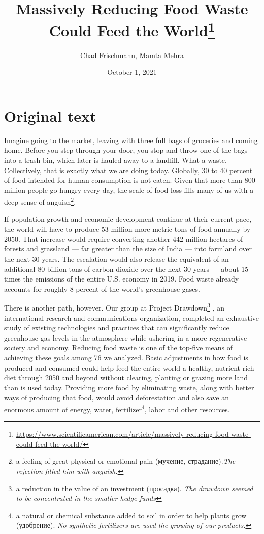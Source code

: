 \documentclass[a4paper]{article}
\title{Massively Reducing Food Waste Could Feed the World\footnote{\url{https://www.scientificamerican.com/article/massively-reducing-food-waste-could-feed-the-world/}}}
\author{Chad Frischmann, Mamta Mehra}
\date{October 1, 2021}
\begin{document}
	\maketitle
\section*{Original text}
Imagine going to the market, leaving with three full bags of groceries and coming home. Before you step through your door, you stop and throw one of the bags into a trash bin, which later is hauled away to a landfill. What a waste. Collectively, that is exactly what we are doing today. Globally, 30 to 40 percent of food intended for human consumption is not eaten. Given that more than 800 million people go hungry every day, the scale of food loss fills many of us with a deep sense of anguish\footnote{a feeling of great physical or emotional pain (мучение, страдание).\emph{The rejection filled him with anguish.}}.

If population growth and economic development continue at their current pace, the world will have to produce 53 million more metric tons of food annually by 2050. That increase would require converting another 442 million hectares of forests and grassland --- far greater than the size of India --- into farmland over the next 30 years. The escalation would also release the equivalent of an additional 80 billion tons of carbon dioxide over the next 30 years --- about 15 times the emissions of the entire U.S. economy in 2019. Food waste already accounts for roughly 8 percent of the world's greenhouse gases.

There is another path, however. Our group at Project Drawdown\footnote{a reduction in the value of an investment (просадка).\emph{ The drawdown seemed to be concentrated in the smaller hedge funds}} , an international research and communications organization, completed an exhaustive study of existing technologies and practices that can significantly reduce greenhouse gas levels in the atmosphere while ushering in a more regenerative society and economy. Reducing food waste is one of the top-five means of achieving these goals among 76 we analyzed. Basic adjustments in how food is produced and consumed could help feed the entire world a healthy, nutrient-rich diet through 2050 and beyond without clearing, planting or grazing more land than is used today. Providing more food by eliminating waste, along with better ways of producing that food, would avoid deforestation and also save an enormous amount of energy, water, fertilizer\footnote{a natural or chemical substance added to soil in order to help plants grow (удобрение).\emph{ No synthetic fertilizers are used the growing of our products. }}, labor and other resources.
\end{document}

